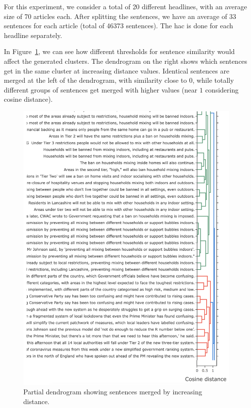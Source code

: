 For this experiment, we consider a total of 20 different headlines, with an average size of 70 articles each.
After splitting the sentences, we have an average of 33 sentences for each article (total of 46373 sentences).
The \acrshort{hac} is done for each headline separately.

In Figure~\ref{fig:dendrogram}, we can see how different thresholds for sentence similarity would affect the generated clusters. The dendrogram on the right shows which sentences get in the same cluster at increasing distance values. Identical sentences are merged at the left of the dendrogram, with similarity close to $0$, while totally different groups of sentences get merged with higher values (near $1$ considering cosine distance).
\begin{figure}[!htb]
    \centering
    \includegraphics[width=\linewidth]{figures/dendrogram_high_legend.png}
    \caption{Partial dendrogram showing sentences merged by increasing distance.}
    \label{fig:dendrogram}
\end{figure}

